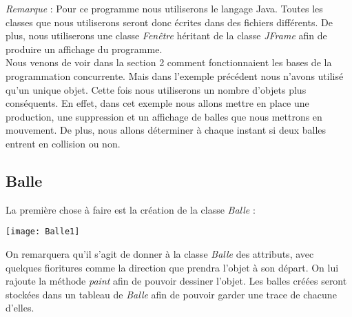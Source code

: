 \documentclass{article}
\begin{document}
\textit{Remarque} : Pour ce programme nous utiliserons le langage Java. Toutes les classes que nous utiliserons seront donc \'{e}crites dans des fichiers diff\'{e}rents. De plus, nous utiliserons une classe \textit{Fen\^{e}tre} h\'{e}ritant de la classe \textit{JFrame} afin de produire un affichage du programme.\\

Nous venons de voir dans la section 2 comment fonctionnaient les bases de la programmation concurrente. Mais dans l'exemple pr\'{e}c\'{e}dent nous n'avons utilis\'{e} qu'un unique objet. Cette fois nous utiliserons un nombre d'objets plus cons\'{e}quents. En effet, dans cet exemple nous allons mettre en place une production, une suppression et un affichage de balles que nous mettrons en mouvement. De plus, nous allons d\'{e}terminer \`{a} chaque instant si deux balles entrent en collision ou non.

\subsection{Balle}
La premi\`{e}re chose \`{a} faire est la cr\'{e}ation de la classe \textit{Balle} : 
\begin{center}
\texttt{[image: Balle1]} 
\end{center}

On remarquera qu'il s'agit de donner \`{a} la classe \textit{Balle} des attributs, avec quelques fioritures comme la direction que prendra l'objet \`{a} son d\'{e}part. On lui rajoute la m\'{e}thode \textit{paint} afin de pouvoir dessiner l'objet. Les balles cr\'{e}\'{e}es seront stock\'{e}es dans un tableau de \textit{Balle} afin de pouvoir garder une trace de chacune d'elles.
\end{document}
